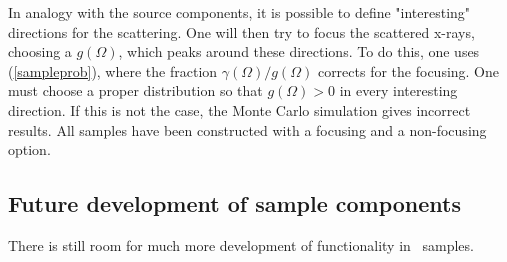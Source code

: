 In analogy with the source components, it is possible to define
"interesting" directions for the scattering.
One will then try to focus the scattered x-rays,
choosing a $g(\Omega)$, which peaks around these directions.
To do this, one uses (\ref{sampleprob}), where the
fraction $\gamma(\Omega)/g(\Omega)$ corrects for the focusing.
One must choose a proper distribution so that
$g(\Omega) > 0$ in every interesting direction. If this is not the
case, the Monte Carlo simulation gives incorrect results.
All samples have been constructed with a focusing
and a non-focusing option.


\subsection{Future development of sample components}
There is still room for much more development of functionality in
\MCX\ samples.

\newpage
 \newpage
          \newpage
   \newpage
 \newpage
%
